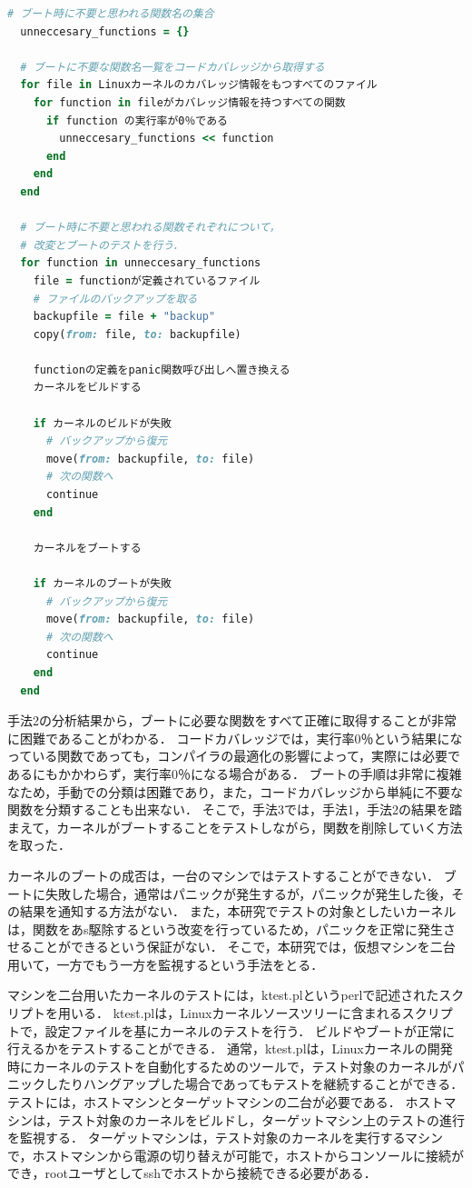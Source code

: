 \documentclass[graduation-thesis]{mlarticle}
\begin{document}
\begin{lstlisting}[language=ruby, caption=手法3の擬似コード, label=code:impl3]
  # ブート時に不要と思われる関数名の集合
  unneccesary_functions = {}

  # ブートに不要な関数名一覧をコードカバレッジから取得する
  for file in Linuxカーネルのカバレッジ情報をもつすべてのファイル
    for function in fileがカバレッジ情報を持つすべての関数
      if function の実行率が0％である
        unneccesary_functions << function
      end
    end
  end

  # ブート時に不要と思われる関数それぞれについて，
  # 改変とブートのテストを行う．
  for function in unneccesary_functions
    file = functionが定義されているファイル
    # ファイルのバックアップを取る
    backupfile = file + "backup"
    copy(from: file, to: backupfile)

    functionの定義をpanic関数呼び出しへ置き換える
    カーネルをビルドする

    if カーネルのビルドが失敗
      # バックアップから復元
      move(from: backupfile, to: file)
      # 次の関数へ
      continue
    end

    カーネルをブートする

    if カーネルのブートが失敗
      # バックアップから復元
      move(from: backupfile, to: file)
      # 次の関数へ
      continue
    end
  end
\end{lstlisting}

手法2の分析結果から，ブートに必要な関数をすべて正確に取得することが非常に困難であることがわかる．
コードカバレッジでは，実行率0％という結果になっている関数であっても，コンパイラの最適化の影響によって，実際には必要であるにもかかわらず，実行率0％になる場合がある．
ブートの手順は非常に複雑なため，手動での分類は困難であり，また，コードカバレッジから単純に不要な関数を分類することも出来ない．
そこで，手法3では，手法1，手法2の結果を踏まえて，カーネルがブートすることをテストしながら，関数を削除していく方法を取った．

カーネルのブートの成否は，一台のマシンではテストすることができない．
ブートに失敗した場合，通常はパニックが発生するが，パニックが発生した後，その結果を通知する方法がない．
また，本研究でテストの対象としたいカーネルは，関数をあs駆除するという改変を行っているため，パニックを正常に発生させることができるという保証がない．
そこで，本研究では，仮想マシンを二台用いて，一方でもう一方を監視するという手法をとる．

マシンを二台用いたカーネルのテストには，ktest.plというperlで記述されたスクリプトを用いる．
ktest.plは，Linuxカーネルソースツリーに含まれるスクリプトで，設定ファイルを基にカーネルのテストを行う．
ビルドやブートが正常に行えるかをテストすることができる．
通常，ktest.plは，Linuxカーネルの開発時にカーネルのテストを自動化するためのツールで，テスト対象のカーネルがパニックしたりハングアップした場合であってもテストを継続することができる．
テストには，ホストマシンとターゲットマシンの二台が必要である．
ホストマシンは，テスト対象のカーネルをビルドし，ターゲットマシン上のテストの進行を監視する．
ターゲットマシンは，テスト対象のカーネルを実行するマシンで，ホストマシンから電源の切り替えが可能で，ホストからコンソールに接続ができ，rootユーザとしてsshでホストから接続できる必要がある．
\end{document}
